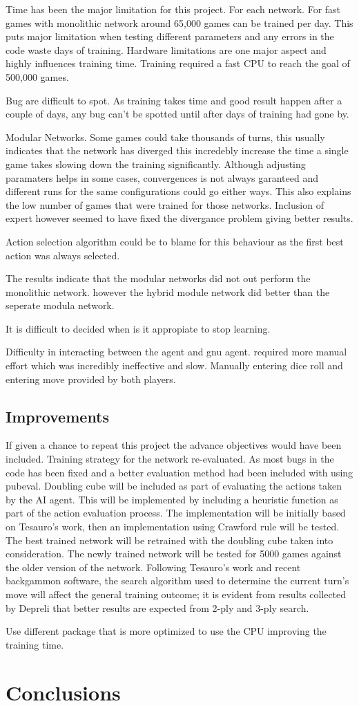 \documentclass[12pt,a4paper]{article}
\begin{document}
Time has been the major limitation for this project. For each network. For fast games with monolithic network around 65,000 games can be trained per day. This puts major limitation when testing different parameters and any errors in the code waste days of training. Hardware limitations are one major aspect and highly influences training time. Training required a fast CPU to reach the goal of 500,000 games. 

Bug are difficult to spot. As training takes time and good result happen after a couple of days, any bug can't be spotted until after days of training had gone by. 

Modular Networks. Some games could take thousands of turns, this usually indicates that the network has diverged this incredebly increase the time a single game takes slowing down the training significantly. Although adjusting paramaters helps in some cases, convergences is not always garanteed and different runs for the same configurations could go either ways. This also explains the low number of games that were trained for those networks. Inclusion of expert however seemed to have fixed the divergance problem giving better results. 

Action selection algorithm could be to blame for this behaviour as the first best action was always selected. 

The results indicate that the modular networks did not out perform the monolithic network. however the hybrid module network did better than the seperate modula network. 

It is difficult to decided when is it appropiate to stop learning. 

Difficulty in interacting between the agent and gnu agent. required more manual effort which was incredibly ineffective and slow. Manually entering dice roll and entering move provided by both players.

\subsection{Improvements}
If given a chance to repeat this project the advance objectives would have been included. Training strategy for the network re-evaluated. As most bugs in the code has been fixed and a better evaluation method had been included with using pubeval. Doubling cube will be included as part of evaluating the actions taken by the AI agent. This will be implemented by including a heuristic function as part of the action evaluation process. The implementation will be initially based on Tesauro's \citeyear{DBLP:journals/ai/Tesauro02} work, then an implementation using Crawford rule will be tested. The best trained network will be retrained with the doubling cube taken into consideration. The newly trained network will be tested for 5000 games against the older version of the network. 
Following Tesauro's \citeyear{DBLP:journals/ai/Tesauro02} work and recent backgammon software, the search algorithm used to determine the current turn's move will affect the general training outcome; it is evident from results collected by Depreli \citeyear{botbattle} that better results are expected from 2-ply and 3-ply search. 

Use different package that is more optimized to use the CPU improving the training time.

\section{Conclusions}


\end{document}
